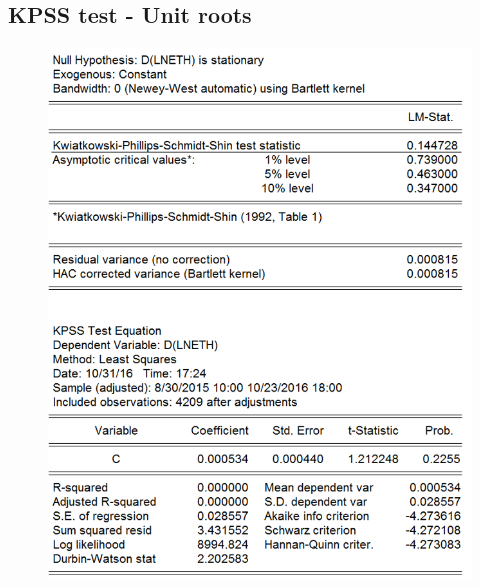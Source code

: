 \documentclass[11pt]{report}
\begin{document}
\subsection*{KPSS test - Unit roots}
\begin{figure}[!h]
\begin{minipage}[c]{.46\linewidth}
\includegraphics[scale=0.5]{Appendix/chap2/8}
\end{minipage} \hfill
\begin{minipage}[c]{.46\linewidth}

\end{minipage}
\end{figure}
\end{document}
